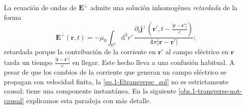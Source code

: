 La ecuación de ondas de \(\mathbf{E}^\perp\) admite una solución inhomogénea \emph{retardada} de la forma 
\begin{equation}
    \label{eq.1-Etransverse_sol}
    \mathbf{E}^\perp(\mathbf{r}, t) = - \mu_0 \int_{\mathbb{R}^3}\mathrm{d}^3r'\, \frac{\partial_t \mathbf{j}^\perp\left(\mathbf{r}', t-\frac{\left|\mathbf{r}-\mathbf{r}'\right|}{c}\right)}{4\pi \left|\mathbf{r}-\mathbf{r}'\right|};
\end{equation} 
retardada porque la contribución de la corriente en \(\mathbf{r}'\) al campo eléctrico en \(\mathbf{r}\) tarda un tiempo \(\frac{\left|\mathbf{r}-\mathbf{r}'\right|}{c}\) en llegar. Este hecho lleva a una confusión habitual. A pesar de que los cambios de la corriente que generan un campo eléctrico se propagan con velocidad finita, la \cref{eq.1-Etransverse_sol} no es estrictamente causal; tiene una componente instantánea. En la siguiente \cref{obs.1-transverse-not-causal} explicamos esta paradoja con más detalle.

